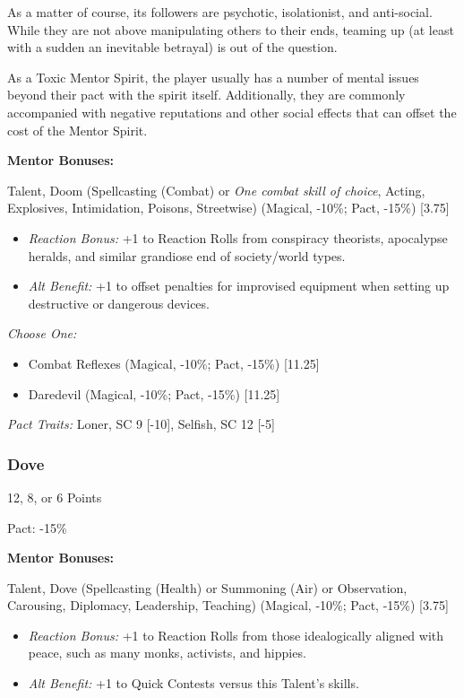 \begin{multicols}{3}
	As a matter of course, its followers are psychotic, isolationist, and anti-social. While they are not above manipulating others to their ends, teaming up (at least with a sudden an inevitable betrayal) is out of the question.
	
	As a Toxic Mentor Spirit, the player usually has a number of mental issues beyond their pact with the spirit itself. Additionally, they are commonly accompanied with negative reputations and other social effects that can offset the cost of the Mentor Spirit.
	
	\textbf{Mentor Bonuses:} 
	
	Talent, Doom (Spellcasting (Combat) or \textit{One combat skill of choice}, Acting, Explosives, Intimidation, Poisons, Streetwise) (Magical, -10\%; Pact, -15\%) [3.75]
	\begin{itemize}
		\itemsep 0pt
		\item \textit{Reaction Bonus:} +1 to Reaction Rolls from conspiracy theorists, apocalypse heralds, and similar grandiose end of society/world types.
		\item \textit{Alt Benefit:} +1 to offset penalties for improvised equipment when setting up destructive or dangerous devices.
	\end{itemize}
	
	\textit{Choose One:}
	\begin{itemize}
		\itemsep 0pt
		\item Combat Reflexes (Magical, -10\%; Pact, -15\%) [11.25]
		\item Daredevil (Magical, -10\%; Pact, -15\%) [11.25]
	\end{itemize}
	
	\textit{Pact Traits:} Loner, SC 9 [-10], Selfish, SC 12 [-5]
	
	\subsubsection{Dove}
	\begin{flushright}
		12, 8, or 6 Points
	\end{flushright}
	Pact: -15\%
	
	
	\textbf{Mentor Bonuses:} 
	
	Talent, Dove (Spellcasting (Health) or Summoning (Air) or Observation, Carousing, Diplomacy, Leadership, Teaching) (Magical, -10\%; Pact, -15\%) [3.75]
	\begin{itemize}
		\itemsep 0pt
		\item \textit{Reaction Bonus:} +1 to Reaction Rolls from those idealogically aligned with peace, such as many monks, activists, and hippies.
		\item \textit{Alt Benefit:} +1 to Quick Contests versus this Talent's skills.
	\end{itemize}
	

\end{multicols}

